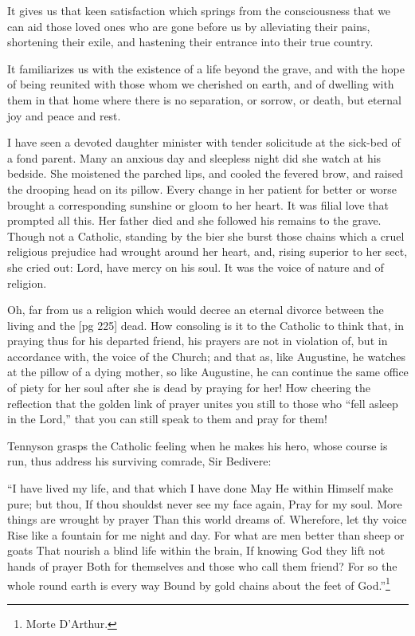 It gives us that keen satisfaction which springs
from the consciousness that we can aid those loved
ones who are gone before us by alleviating their
pains, shortening their exile, and hastening their
entrance into their true country.

It familiarizes us with the existence of a life beyond
the grave, and with the hope of being reunited
with those whom we cherished on earth, and
of dwelling with them in that home where there is
no separation, or sorrow, or death, but eternal joy
and peace and rest.

I have seen a devoted daughter minister with
tender solicitude at the sick-bed of a fond parent.
Many an anxious day and sleepless night did she
watch at his bedside. She moistened the parched
lips, and cooled the fevered brow, and raised the
drooping head on its pillow. Every change in
her patient for better or worse brought a corresponding
sunshine or gloom to her heart. It was
filial love that prompted all this. Her father
died and she followed his remains to the grave.
Though not a Catholic, standing by the bier she
burst those chains which a cruel religious prejudice
had wrought around her heart, and, rising
superior to her sect, she cried out: Lord, have
mercy on his soul. It was the voice of nature and
of religion.

Oh, far from us a religion which would decree
an eternal divorce between the living and the
[pg 225]
dead. How consoling is it to the Catholic to think
that, in praying thus for his departed friend, his
prayers are not in violation of, but in accordance
with, the voice of the Church; and that as, like
Augustine, he watches at the pillow of a dying
mother, so like Augustine, he can continue the
same office of piety for her soul after she is dead
by praying for her! How cheering the reflection
that the golden link of prayer unites you still to
those who “fell asleep in the Lord,” that you
can still speak to them and pray for them!

Tennyson grasps the Catholic feeling when he
makes his hero, whose course is run, thus address
his surviving comrade, Sir Bedivere:

“I have lived my life, and that which I have done
May He within Himself make pure; but thou,
If thou shouldst never see my face again,
Pray for my soul. More things are wrought by prayer
Than this world dreams of. Wherefore, let thy voice
Rise like a fountain for me night and day.
For what are men better than sheep or goats
That nourish a blind life within the brain,
If knowing God they lift not hands of prayer
Both for themselves and those who call them friend?
For so the whole round earth is every way
Bound by gold chains about the feet of
God.”\footnote{Morte D'Arthur.}

